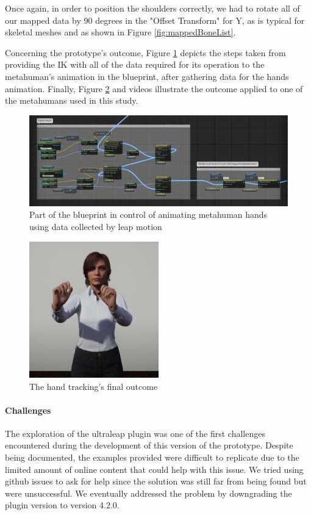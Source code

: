 Once again, in order to position the shoulders correctly, we had to rotate all of our mapped data by 90 degrees in the "Offset Transform" for Y, as is typical for skeletal meshes and as shown in Figure \ref{fig:mappedBoneList}.

Concerning the prototype's outcome, Figure \ref{fig:BPHandsAndIK} depicts the steps taken from providing the IK with all of the data required for its operation to the metahuman's animation in the blueprint, after gathering data for the hands animation. Finally, Figure \ref{fig:handTrack} and videos \cite{APT1,APT2} illustrate the outcome applied to one of the metahumans used in this study.

\begin{figure}[!htb]
\includegraphics[width=\textwidth]{figures/BPHandsAndIK.png}
\centering
\caption{Part of the blueprint in control of animating metahuman hands using data collected by leap motion}
\label{fig:BPHandsAndIK}
\end{figure}

\begin{figure}[!htb]
\includegraphics[width=0.5\textwidth]{figures/final.png}
\centering
\caption{The hand tracking's final outcome}
\label{fig:handTrack}
\end{figure}

\paragraph{Challenges}
The exploration of the ultraleap plugin was one of the first challenges encountered during the development of this version of the prototype. Despite being documented, the examples provided were difficult to replicate due to the limited amount of online content that could help with this issue. We tried using github issues to ask for help since the solution was still far from being found but were unsuccessful. We eventually addressed the problem by downgrading the plugin version to version 4.2.0. 

